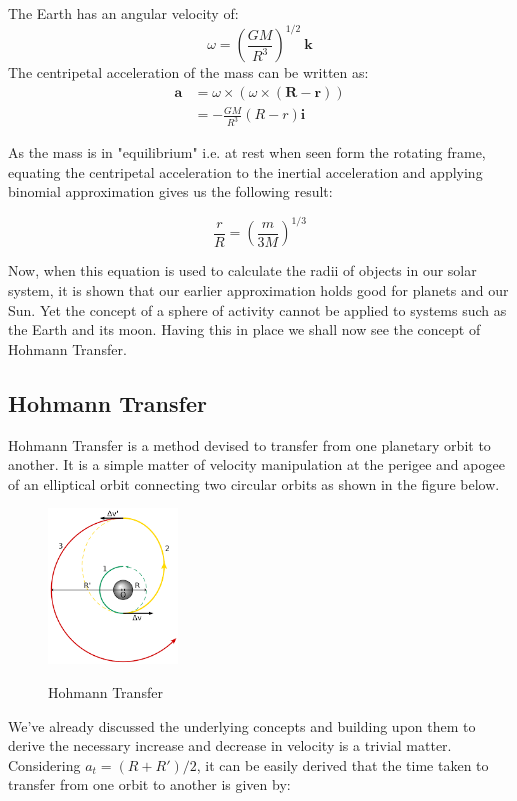 \documentclass[12pt, letterpaper]{article}
\begin{document}
The Earth has an angular velocity of:
\[
	\omega = \left(\frac{GM}{R^3}\right)^{1/2} \: \mathbf{k}
\]
The centripetal acceleration of the mass can be written as:
\begin{equation}
\begin{split}
	\mathbf{a} & = \omega \times(\omega \times (\mathbf{R} - \mathbf{r}))\\
				& = - \frac{GM}{R^3}(R - r)\mathbf{i}
\end{split}
\end{equation}

As the mass is in "equilibrium" i.e. at rest when seen form the rotating frame, equating the centripetal acceleration to the inertial acceleration and applying binomial approximation gives us the following result:

\[
	\frac{r}{R} = \left( \frac{m}{3M} \right)^{1/3}
\]

Now, when this equation is used to calculate the radii of objects in our solar system, it is shown that our earlier approximation holds good for planets and our Sun. Yet the concept of a sphere of activity cannot be applied to systems such as the Earth and its moon. Having this in place we shall now see the concept of Hohmann Transfer.

\subsection{Hohmann Transfer}
Hohmann Transfer is a method devised to transfer from one planetary orbit to another. It is a simple matter of velocity manipulation at the perigee and apogee of an elliptical orbit connecting two circular orbits as shown in the figure below. 

\begin{figure}[h!]
	\centering
    \includegraphics[width = 130px]{Hohmann}
    \label{fig:Hohmann}
    \caption{Hohmann Transfer}
\end{figure}

We've already discussed the underlying concepts and building upon them to derive the necessary increase and decrease in velocity is a trivial matter. Considering $a_t = (R + R')/2$, it can be easily derived that the time taken to transfer from one orbit to another is given by:
\end{document}

